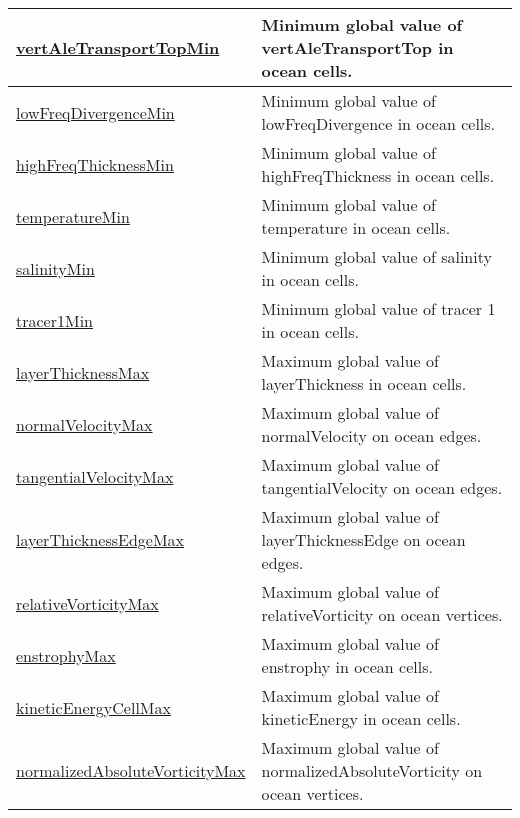 {\begin{center}
\begin{longtable}{| p{2.0in} | p{4.0in} |}
	\hline
	\hyperref[subsec:var_sec_amGlobalStats_vertAleTransportTopMin]{vertAleTransportTopMin} & Minimum global value of vertAleTransportTop in ocean cells. \\
	\hline
	\hyperref[subsec:var_sec_amGlobalStats_lowFreqDivergenceMin]{lowFreqDivergenceMin} & Minimum global value of lowFreqDivergence in ocean cells. \\
	\hline
	\hyperref[subsec:var_sec_amGlobalStats_highFreqThicknessMin]{highFreqThicknessMin} & Minimum global value of highFreqThickness in ocean cells. \\
	\hline
	\hyperref[subsec:var_sec_amGlobalStats_temperatureMin]{temperatureMin} & Minimum global value of temperature in ocean cells. \\
	\hline
	\hyperref[subsec:var_sec_amGlobalStats_salinityMin]{salinityMin} & Minimum global value of salinity in ocean cells. \\
	\hline
	\hyperref[subsec:var_sec_amGlobalStats_tracer1Min]{tracer1Min} & Minimum global value of tracer 1 in ocean cells. \\
	\hline
	\hyperref[subsec:var_sec_amGlobalStats_layerThicknessMax]{layerThicknessMax} & Maximum global value of layerThickness in ocean cells. \\
	\hline
	\hyperref[subsec:var_sec_amGlobalStats_normalVelocityMax]{normalVelocityMax} & Maximum global value of normalVelocity on ocean edges. \\
	\hline
	\hyperref[subsec:var_sec_amGlobalStats_tangentialVelocityMax]{tangentialVelocityMax} & Maximum global value of tangentialVelocity on ocean edges. \\
	\hline
	\hyperref[subsec:var_sec_amGlobalStats_layerThicknessEdgeMax]{layerThicknessEdgeMax} & Maximum global value of layerThicknessEdge on ocean edges. \\
	\hline
	\hyperref[subsec:var_sec_amGlobalStats_relativeVorticityMax]{relativeVorticityMax} & Maximum global value of relativeVorticity on ocean vertices. \\
	\hline
	\hyperref[subsec:var_sec_amGlobalStats_enstrophyMax]{enstrophyMax} & Maximum global value of enstrophy in ocean cells. \\
	\hline
	\hyperref[subsec:var_sec_amGlobalStats_kineticEnergyCellMax]{kineticEnergyCellMax} & Maximum global value of kineticEnergy in ocean cells. \\
	\hline
	\hyperref[subsec:var_sec_amGlobalStats_normalizedAbsoluteVorticityMax]{normalizedAbsoluteVorticityMax} & Maximum global value of normalizedAbsoluteVorticity on ocean vertices. \\

\end{longtable}
\end{center}}
